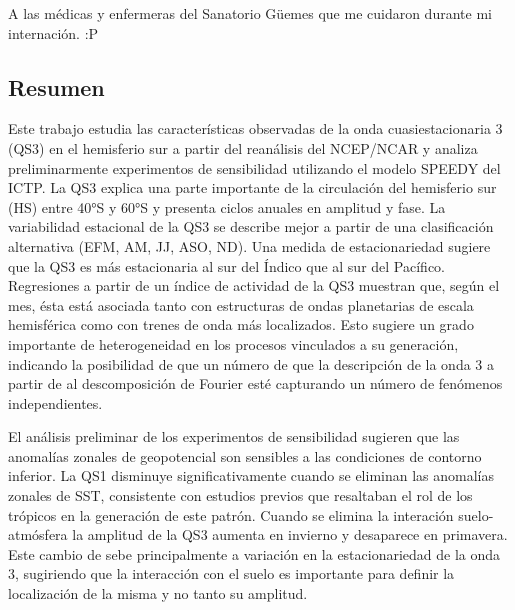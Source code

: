 \documentclass[spanish,a4paper,12pt,oneside]{book}
\begin{document}
A las médicas y enfermeras del Sanatorio Güemes que me cuidaron durante
mi internación. :P

\newpage

\begin{center}\begin{minipage}{\dimexpr\paperwidth-7cm}
\chapter*{Resumen}

Este trabajo estudia las características observadas de la onda cuasiestacionaria 3 (QS3) en el hemisferio sur a partir del reanálisis del NCEP/NCAR y analiza preliminarmente experimentos de sensibilidad utilizando el modelo SPEEDY del ICTP. La QS3 explica una parte importante de la circulación del hemisferio sur (HS) entre 40°S y 60°S y presenta ciclos anuales en amplitud y fase. La variabilidad estacional de la QS3 se describe mejor a partir de una clasificación alternativa (EFM, AM, JJ, ASO, ND). Una medida de estacionariedad sugiere que la QS3 es más estacionaria al sur del Índico que al sur del Pacífico. Regresiones a partir de un índice de actividad de la QS3 muestran que, según el mes, ésta está asociada tanto con estructuras de ondas planetarias de escala hemisférica como con trenes de onda más localizados. Esto sugiere un grado importante de heterogeneidad en los procesos vinculados a su generación, indicando la posibilidad de que un número de que la descripción de la onda 3 a partir de al descomposición de Fourier esté capturando un número de fenómenos independientes. 

El análisis preliminar de los experimentos de sensibilidad sugieren que las anomalías zonales de geopotencial son sensibles a las condiciones de contorno inferior. La QS1 disminuye significativamente cuando se eliminan las anomalías zonales de SST, consistente con estudios previos que resaltaban el rol de los trópicos en la generación de este patrón. Cuando se elimina la interación suelo-atmósfera la amplitud de la QS3 aumenta en invierno y desaparece en primavera. Este cambio de sebe principalmente a variación en la estacionariedad de la onda 3, sugiriendo que la interacción con el suelo es importante para definir la localización de la misma y no tanto su amplitud. 

\end{minipage}
\end{center}

\setcounter{tocdepth}{3} \tableofcontents
\end{document}

